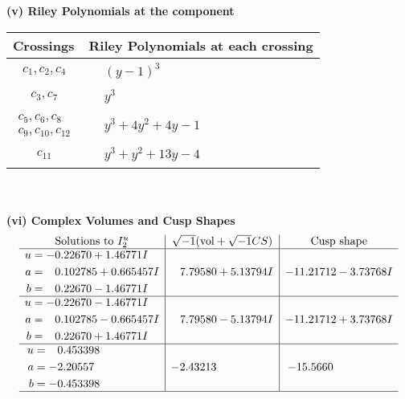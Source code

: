 \documentclass[1p]{elsarticle_modified}
\theoremstyle{definition}
\newcommand{\I}{\sqrt{-1}}
\begin{document}
\flushleft \textbf{(v) Riley Polynomials at the component}\newline \\
\begin{tabular}{m{50pt}|m{274pt}}
Crossings & \hspace{64pt}Riley Polynomials at each crossing \\
\hline $$\begin{aligned}c_{1},c_{2},c_{4}\end{aligned}$$&$\begin{aligned}
&(y-1)^3
\end{aligned}$\\
\hline $$\begin{aligned}c_{3},c_{7}\end{aligned}$$&$\begin{aligned}
&y^3
\end{aligned}$\\
\hline $$\begin{aligned}c_{5},c_{6},c_{8}\\c_{9},c_{10},c_{12}\end{aligned}$$&$\begin{aligned}
&y^3+4 y^2+4 y-1
\end{aligned}$\\
\hline $$\begin{aligned}c_{11}\end{aligned}$$&$\begin{aligned}
&y^3+y^2+13 y-4
\end{aligned}$\\
\hline
\end{tabular}\\~\\
\newpage\flushleft \textbf{(vi) Complex Volumes and Cusp Shapes}
$$\begin{array}{c|c|c}  
\text{Solutions to }I^u_{2}& \I (\text{vol} + \sqrt{-1}CS) & \text{Cusp shape}\\
 \hline 
\begin{aligned}
u &= -0.22670 + 1.46771 I \\
a &= \phantom{-}0.102785 + 0.665457 I \\
b &= \phantom{-}0.22670 - 1.46771 I\end{aligned}
 & \phantom{-}7.79580 + 5.13794 I & -11.21712 - 3.73768 I \\ \hline\begin{aligned}
u &= -0.22670 - 1.46771 I \\
a &= \phantom{-}0.102785 - 0.665457 I \\
b &= \phantom{-}0.22670 + 1.46771 I\end{aligned}
 & \phantom{-}7.79580 - 5.13794 I & -11.21712 + 3.73768 I \\ \hline\begin{aligned}
u &= \phantom{-}0.453398\phantom{ +0.000000I} \\
a &= -2.20557\phantom{ +0.000000I} \\
b &= -0.453398\phantom{ +0.000000I}\end{aligned}
 & -2.43213\phantom{ +0.000000I} & -15.5660\phantom{ +0.000000I}\\
 \hline 
 \end{array}$$\newpage\newpage\renewcommand{\arraystretch}{1}
\end{document}
